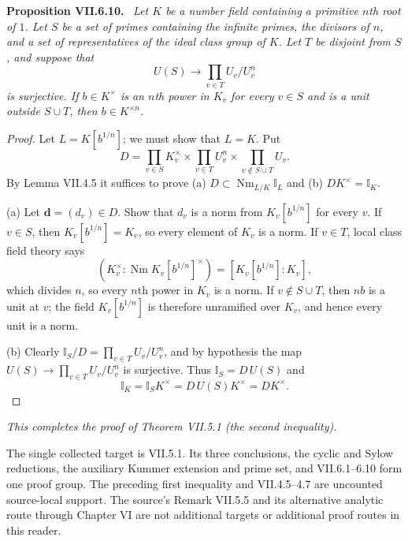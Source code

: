 \documentclass[11pt]{article}
\newcommand{\I}{\mathbb I}
\newcommand{\Nm}{\operatorname{Nm}}
\newenvironment{authorresult}[2]{\par\medskip\noindent\textbf{#1 VII.#2.}\ \itshape}{\par\medskip}
\begin{document}
\begin{authorresult}{Proposition}{6.10}
Let $K$ be a number field containing a primitive $n$th root of $1$.
Let $S$ be a set of primes containing the infinite primes, the divisors of
$n$, and a set of representatives of the ideal class group of $K$.
Let $T$ be disjoint from $S$, and suppose that
\[
 U(S)\longrightarrow\prod_{v\in T}U_v/U_v^n
\]
is surjective. If $b\in K^\times$ is an $n$th power in $K_v$ for every
$v\in S$ and is a unit outside $S\cup T$, then $b\in K^{\times n}$.
\end{authorresult}
\begin{proof}
Let $L=K[b^{1/n}]$; we must show that $L=K$. Put
\[
 D=\prod_{v\in S}K_v^\times\times
   \prod_{v\in T}U_v^n\times\prod_{v\notin S\cup T}U_v.
\]
By Lemma VII.4.5 it suffices to prove (a) $D\subset\Nm_{L/K}\I_L$ and
(b) $DK^\times=\I_K$.

(a) Let $\mathbf d=(d_v)\in D$. Show that $d_v$ is a norm from
$K_v[b^{1/n}]$ for every $v$. If $v\in S$, then $K_v[b^{1/n}]=K_v$, so
every element of $K_v$ is a norm. If $v\in T$, local class field theory says
\[
 (K_v^\times:\Nm K_v[b^{1/n}]^\times)=[K_v[b^{1/n}]:K_v],
\]
which divides $n$, so every $n$th power in $K_v$ is a norm.
If $v\notin S\cup T$, then $nb$ is a unit at $v$; the field
$K_v[b^{1/n}]$ is therefore unramified over $K_v$, and hence every unit
is a norm.

(b) Clearly $\I_S/D=\prod_{v\in T}U_v/U_v^n$, and by hypothesis the map
$U(S)\longrightarrow\prod_{v\in T}U_v/U_v^n$ is surjective.
Thus $\I_S=D\,U(S)$ and
\[
 \I_K=\I_S K^\times=D\,U(S)K^\times=DK^\times.
\]
\end{proof}

\emph{This completes the proof of Theorem VII.5.1 (the second inequality).}

\medskip
\noindent\small
The single collected target is VII.5.1. Its three conclusions, the cyclic
and Sylow reductions, the auxiliary Kummer extension and prime set, and
VII.6.1--6.10 form one proof group. The preceding first inequality and
VII.4.5--4.7 are uncounted source-local support. The source's Remark VII.5.5
and its alternative analytic route through Chapter VI are not additional
targets or additional proof routes in this reader.
\end{document}
